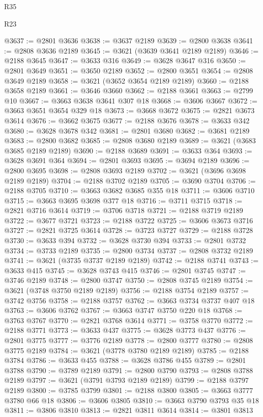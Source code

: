 \begin{lexlean}{R35}
\begin{lexlean}{R23}
\begin{coremodule}
{{{{{{{{{{{{{{{{{{{{{@3637 := @2801 @3636
@3638 := @3637 @2189
@3639 := @2800 @3638
@3641 := @2808 @3636 @2189
@3645 := @3621 (@3639 @3641 @2189 @2189)
@3646 := @2188 @3645
@3647 := @3633 @316
@3649 := @3628 @3647 @316
@3650 := @2801 @3649
@3651 := @3650 @2189
@3652 := @2800 @3651
@3654 := @2808 @3649 @2189
@3658 := @3621 (@3652 @3654 @2189 @2189)
@3660 := @2188 @3658 @2189
@3661 := @3646 @3660
@3662 := @2188 @3661
@3663 := @2799 @10
@3667 := @3663 @3638 @3641 @307 @18
@3668 := @3606 @3667
@3672 := @3663 @3651 @3654 @329 @18
@3673 := @3668 @3672
@3675 := @2821 @3673 @3614
@3676 := @3662 @3675
@3677 := @2188 @3676
@3678 := @3633 @342
@3680 := @3628 @3678 @342
@3681 := @2801 @3680
@3682 := @3681 @2189
@3683 := @2800 @3682
@3685 := @2808 @3680 @2189
@3689 := @3621 (@3683 @3685 @2189 @2189)
@3690 := @2188 @3689
@3691 := @3633 @364
@3693 := @3628 @3691 @364
@3694 := @2801 @3693
@3695 := @3694 @2189
@3696 := @2800 @3695
@3698 := @2808 @3693 @2189
@3702 := @3621 (@3696 @3698 @2189 @2189)
@3704 := @2188 @3702 @2189
@3705 := @3690 @3704
@3706 := @2188 @3705
@3710 := @3663 @3682 @3685 @355 @18
@3711 := @3606 @3710
@3715 := @3663 @3695 @3698 @377 @18
@3716 := @3711 @3715
@3718 := @2821 @3716 @3614
@3719 := @3706 @3718
@3721 := @2188 @3719 @2189
@3722 := @3677 @3721
@3723 := @2188 @3722
@3725 := @3606 @3673 @3716
@3727 := @2821 @3725 @3614
@3728 := @3723 @3727
@3729 := @2188 @3728
@3730 := @3633 @394
@3732 := @3628 @3730 @394
@3733 := @2801 @3732
@3734 := @3733 @2189
@3735 := @2800 @3734
@3737 := @2808 @3732 @2189
@3741 := @3621 (@3735 @3737 @2189 @2189)
@3742 := @2188 @3741
@3743 := @3633 @415
@3745 := @3628 @3743 @415
@3746 := @2801 @3745
@3747 := @3746 @2189
@3748 := @2800 @3747
@3750 := @2808 @3745 @2189
@3754 := @3621 (@3748 @3750 @2189 @2189)
@3756 := @2188 @3754 @2189
@3757 := @3742 @3756
@3758 := @2188 @3757
@3762 := @3663 @3734 @3737 @407 @18
@3763 := @3606 @3762
@3767 := @3663 @3747 @3750 @220 @18
@3768 := @3763 @3767
@3770 := @2821 @3768 @3614
@3771 := @3758 @3770
@3772 := @2188 @3771
@3773 := @3633 @437
@3775 := @3628 @3773 @437
@3776 := @2801 @3775
@3777 := @3776 @2189
@3778 := @2800 @3777
@3780 := @2808 @3775 @2189
@3784 := @3621 (@3778 @3780 @2189 @2189)
@3785 := @2188 @3784
@3786 := @3633 @455
@3788 := @3628 @3786 @455
@3789 := @2801 @3788
@3790 := @3789 @2189
@3791 := @2800 @3790
@3793 := @2808 @3788 @2189
@3797 := @3621 (@3791 @3793 @2189 @2189)
@3799 := @2188 @3797 @2189
@3800 := @3785 @3799
@3801 := @2188 @3800
@3805 := @3663 @3777 @3780 @66 @18
@3806 := @3606 @3805
@3810 := @3663 @3790 @3793 @35 @18
@3811 := @3806 @3810
@3813 := @2821 @3811 @3614
@3814 := @3801 @3813
}}}}}}}}}}}}}}}}}}}}}
\end{coremodule}
\end{lexlean}
\end{lexlean}
